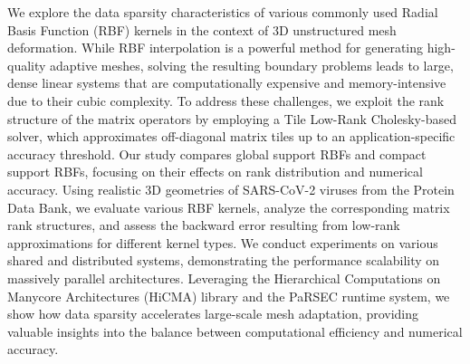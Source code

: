 We explore the data sparsity characteristics of various commonly used Radial Basis Function (RBF) kernels in the context of 3D unstructured mesh deformation. While RBF interpolation is a powerful method for generating high-quality adaptive meshes, solving the resulting boundary problems leads to large, dense linear systems that are computationally expensive and memory-intensive due to their cubic complexity. To address these challenges, we exploit the rank structure of the matrix operators by employing a Tile Low-Rank Cholesky-based solver, which approximates off-diagonal matrix tiles up to an application-specific accuracy threshold. Our study compares global support RBFs and compact support RBFs, focusing on their effects on rank distribution and numerical accuracy. Using realistic 3D geometries of SARS-CoV-2 viruses from the Protein Data Bank, we evaluate various RBF kernels, analyze the corresponding matrix rank structures, and assess the backward error resulting from low-rank approximations for different kernel types. We conduct experiments on various shared and distributed systems, demonstrating the performance scalability on massively parallel architectures. Leveraging the Hierarchical Computations on Manycore Architectures (HiCMA) library and the PaRSEC runtime system, we show how data sparsity accelerates large-scale mesh adaptation, providing valuable insights into the balance between computational efficiency and numerical accuracy.
